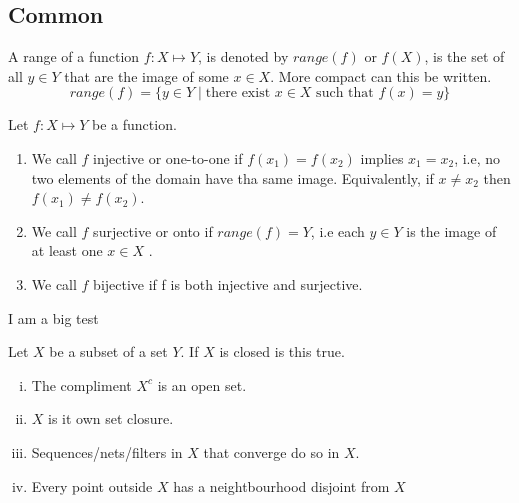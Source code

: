 \documentclass{article}
\theoremstyle{remark}
\begin{document}
\subsection{Common}%
\label{sub:common}

\begin{definition}[Range]
  A range of a function $f: X \mapsto Y$, is denoted by $range\left( f \right) $ or $f\left( X \right) $, is the set of all $y \in Y$ that are the image of some $x \in X$. More compact can this be written. \[
    range\left( f \right) = \{y \in Y  \mid \text{there exist } x \in X \text{ such that } f\left( x \right) = y\} 
  \] 
\end{definition}

\begin{definition}
  Let $f: X \mapsto Y$ be a function. 
  \begin{enumerate}
    \item We call $f$ injective or one-to-one if $f\left( x_1 \right)  = f\left( x_2 \right) $ implies $x_1=x_2$, i.e, no two elements of the domain have tha same image. Equivalently, if $x \neq x_2$ then $f\left( x_1 \right) \neq f\left( x_2 \right) $. 
    \item We call $f$ surjective or onto if $range\left( f \right) = Y$, i.e each $y \in Y$ is the image of at least one $x \in X$ .
    \item We call $f$ bijective if f is both injective and surjective.
  \end{enumerate}
\end{definition}

\begin{definition}[Testing]
  I am a big test 
  
\end{definition}

\begin{definition}

  Let $X$ be a subset of a set $Y$.
  If $X$ is closed is this true.
  \begin{enumerate}[(i)]
    \item The compliment $X^{c}$ is an open set.
    \item $X$ is it own set closure.
    \item Sequences/nets/filters in $X$ that converge do so in $X$.
    \item Every point outside  $X$ has a neightbourhood disjoint from $X$
  \end{enumerate}

\end{definition}



\end{document}
